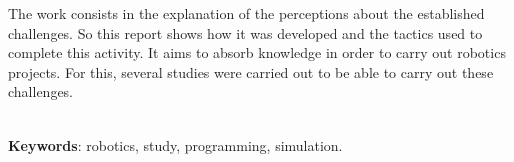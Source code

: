 \begin{thesisabastract}
    The work consists in the explanation of the perceptions about the established challenges. So this report shows how it was developed and the tactics used to complete this activity. It aims to absorb knowledge in order to carry out robotics projects. For this, several studies were carried out to be able to carry out these challenges.


\ \\


\textbf{Keywords}: robotics, study, programming, simulation.

\end{thesisabastract}
